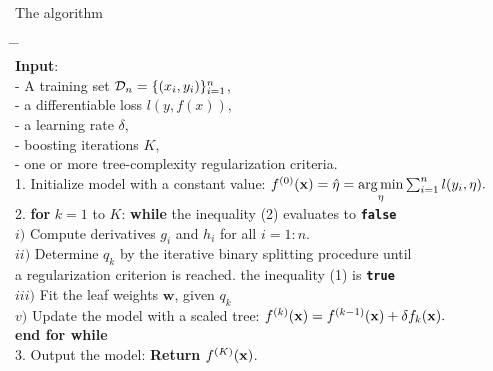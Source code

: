\begin{frame}{The algorithm}
	\small\begin{tabbing}
	\hspace{2em} \= \hspace{2em} \= \hspace{2em} \= \\
	{\bfseries Input}: \\
	\> - A training set $\mathcal{D}_n=\{(x_i, y_{i})\}_{i=1}^n$,\\
	\> - a differentiable loss $l(y,f(x))$,\\
	\> - a learning rate $\delta$,\\
	\> \colorbox{blue!20}{- boosting iterations $K$},\\
	\> \colorbox{blue!20}{- one or more tree-complexity regularization criteria.}\\
	
	1. Initialize model with a constant value:
		$f^{(0)}(\mathbf{x}) = \hat{\eta}= \underset{\eta}{\arg\min} \sum_{i=1}^n l(y_i, \eta).$\\
	
	2. \colorbox{blue!20}{{\bfseries for} $k = 1$ to $K$:} \colorbox{orange!30}{{\bfseries while} the inequality (2) evaluates to \textbf{\texttt{false}} } \\
	
	\>	$i)$ Compute derivatives $g_i$ and $h_i$ for all $i=1:n$.\\
	
	\> $ii)$ Determine $q_k$ by the iterative binary splitting procedure until\\
	\>\> \colorbox{blue!20}{a regularization criterion is reached.} \colorbox{orange!30}{ the inequality (1) is \textbf{\texttt{true}} }\\ 
	
	\> $iii)$ Fit the leaf weights $\mathbf{w}$, given $q_k$\\
	
	\>	$v)$ Update the model with a scaled tree:
		$f^{(k)}(\mathbf{x}) = f^{(k-1)}(\mathbf{x}) + \delta f_k(\mathbf{x}).$\\
	{\bfseries end \colorbox{blue!20}{for} \colorbox{orange!30}{while}}\\
	
	3. Output the model: {\bfseries Return} $f^{(K)}(\mathbf{x})$.%
	
\end{tabbing}

\end{frame}

